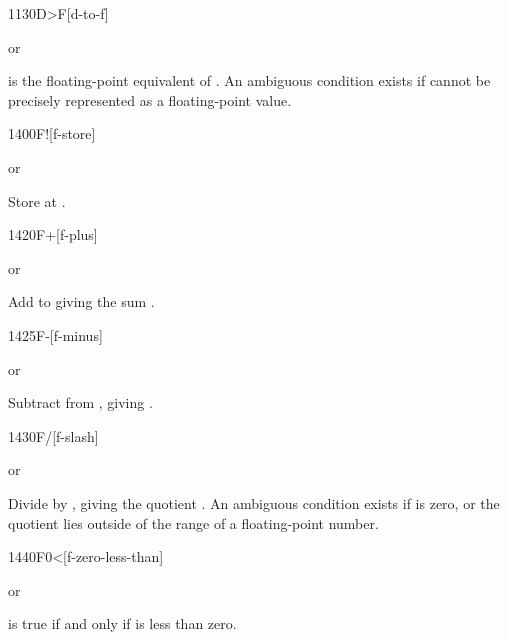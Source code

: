 \begin{worddef}[DtoF]{1130}{D>F}[d-to-f]
\item {}  or

	 is the floating-point equivalent of . An ambiguous
	condition exists if  cannot be precisely represented as a
	floating-point value.
\end{worddef}


\begin{worddef}{1400}{F!}[f-store]
\item {}  or

	Store  at .
\end{worddef}


%


\begin{worddef}{1420}{F+}[f-plus]
\item {} or

	Add  to  giving the sum .
\end{worddef}


\begin{worddef}{1425}{F-}[f-minus]
\item {} or

	Subtract  from , giving .
\end{worddef}


\begin{worddef}{1430}{F/}[f-slash]
\item {} or

	Divide  by , giving the quotient
	. An ambiguous condition exists if  is
	zero, or the quotient lies outside 	of the range of a
	floating-point number.
\end{worddef}


\begin{worddef}[F0less]{1440}{F0<}[f-zero-less-than]
\item {}  or

	 is true if and only if  is less than
	zero.
\end{worddef}


